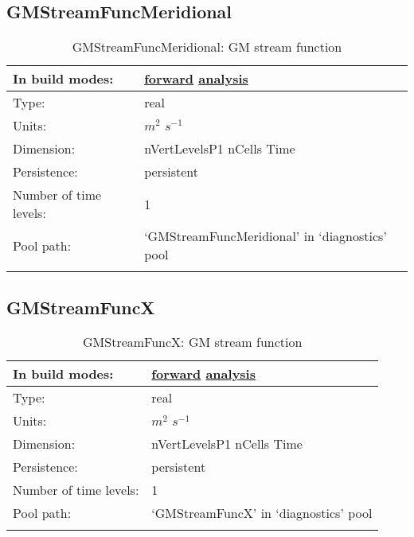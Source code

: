 \subsection[GMStreamFuncMeridional]{GMStreamFuncMeridional}
\label{subsec:var_sec_diagnostics_GMStreamFuncMeridional}
\begin{center}
\begin{longtable}{| p{2.0in} | p{4.0in} |}
        \hline 
        In build modes: & \hyperref[subsec:forward_var_tab_diagnostics]{forward} \hyperref[subsec:analysis_var_tab_diagnostics]{analysis} \\
        \hline 
        Type: & real \\
        \hline 
        Units: & $m^2$ $s^{-1}$ \\
        \hline 
        Dimension: & nVertLevelsP1 nCells Time \\
        \hline 
        Persistence: & persistent \\
        \hline 
        Number of time levels: & 1 \\
        \hline 
            Pool path: & `GMStreamFuncMeridional' in `diagnostics' pool \\
		 \hline 
    \caption{GMStreamFuncMeridional: GM stream function}
\end{longtable}
\end{center}
\subsection[GMStreamFuncX]{GMStreamFuncX}
\label{subsec:var_sec_diagnostics_GMStreamFuncX}
\begin{center}
\begin{longtable}{| p{2.0in} | p{4.0in} |}
        \hline 
        In build modes: & \hyperref[subsec:forward_var_tab_diagnostics]{forward} \hyperref[subsec:analysis_var_tab_diagnostics]{analysis} \\
        \hline 
        Type: & real \\
        \hline 
        Units: & $m^2$ $s^{-1}$ \\
        \hline 
        Dimension: & nVertLevelsP1 nCells Time \\
        \hline 
        Persistence: & persistent \\
        \hline 
        Number of time levels: & 1 \\
        \hline 
            Pool path: & `GMStreamFuncX' in `diagnostics' pool \\
		 \hline 
    \caption{GMStreamFuncX: GM stream function}
\end{longtable}
\end{center}
